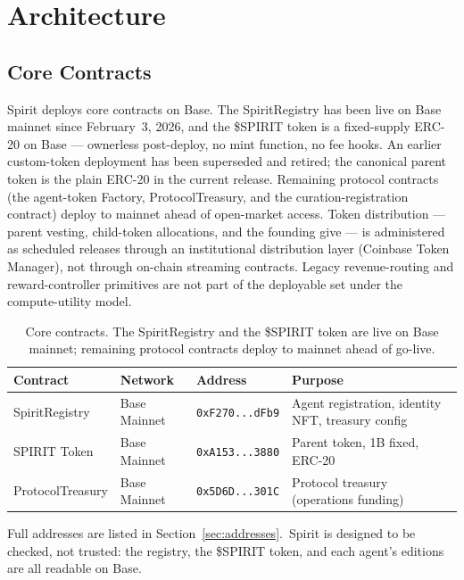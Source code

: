 \documentclass[12pt]{article}
\newcommand{\code}[1]{\texttt{#1}}
\begin{document}
\section{Architecture}

\subsection{Core Contracts}

Spirit deploys core contracts on Base. The SpiritRegistry has been live on
Base mainnet since February~3, 2026, and the \$SPIRIT token is a fixed-supply ERC-20 on Base --- ownerless post-deploy,
no mint function, no fee hooks. An earlier custom-token deployment has been
superseded and retired; the canonical parent token is the plain ERC-20 in the
current release. Remaining protocol contracts (the agent-token Factory,
ProtocolTreasury, and the curation-registration contract) deploy to mainnet
ahead of open-market access. Token distribution --- parent vesting, child-token
allocations, and the founding give --- is administered as scheduled releases
through an institutional distribution layer (Coinbase Token Manager), not
through on-chain streaming contracts. Legacy revenue-routing and reward-controller
primitives are not part of the deployable set under the compute-utility model.

\begin{table}[H]
\centering
\begin{tabular}{@{}llll@{}}
\toprule
\textbf{Contract} & \textbf{Network} & \textbf{Address} & \textbf{Purpose} \\
\midrule
SpiritRegistry &
Base Mainnet &
\code{0xF270...dFb9} &
Agent registration, identity NFT, treasury config \\
SPIRIT Token &
Base Mainnet &
\code{0xA153...3880} &
Parent token, 1B fixed, ERC-20 \\
ProtocolTreasury &
Base Mainnet &
\code{0x5D6D...301C} &
Protocol treasury (operations funding) \\
\bottomrule
\end{tabular}
\caption{Core contracts. The SpiritRegistry and the \$SPIRIT token are live
on Base mainnet; remaining protocol contracts deploy to mainnet ahead of
go-live.}
\end{table}

Full addresses are listed in Section~\ref{sec:addresses}.\ Spirit is
designed to be checked, not trusted: the registry, the \$SPIRIT token, and
each agent's editions are all readable on Base.
\end{document}
